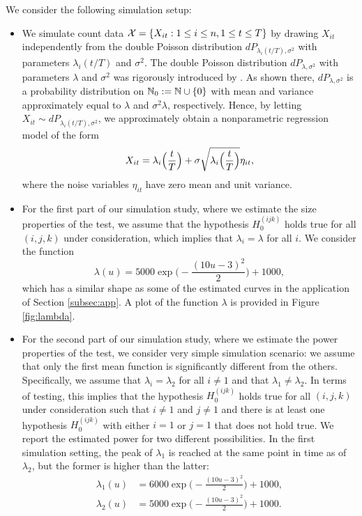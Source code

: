 \documentclass[a4paper,12pt]{article}
\numberwithin{equation}{section}
\begin{document}
We consider the following simulation setup: 
\begin{itemize}[leftmargin=0.45cm]

\item We simulate count data $\mathcal{X} = \{ X_{it}: 1 \le i \le n, 1 \le t \le T \}$ by drawing $X_{it}$ independently from the double Poisson distribution $dP_{\lambda_i(t/T),\sigma^2}$ with parameters $\lambda_i(t/T)$ and $\sigma^2$. The double Poisson distribution $dP_{\lambda,\sigma^2}$ with parameters $\lambda$ and $\sigma^2$ was rigorously introduced by \cite{Efron1986}. As shown there, $dP_{\lambda,\sigma^2}$ is a probability distribution on $\mathbb{N}_0 := \mathbb{N} \cup \{ 0 \}$ with mean and variance approximately equal to $\lambda$ and $\sigma^2 \lambda$, respectively. Hence, by letting $X_{it} \sim dP_{\lambda_i(t/T),\sigma^2}$, we approximately obtain a nonparametric regression model of the form 
\[ X_{it} = \lambda_i\Big(\frac{t}{T}\Big) + \sigma \sqrt{\lambda_i\Big(\frac{t}{T}\Big)} \eta_{it}, \]
where the noise variables $\eta_{it}$ have zero mean and unit variance.

\item For the first part of our simulation study, where we estimate the size properties of the test, we assume that the hypothesis $H_0^{(ijk)}$ holds true for all $(i,j,k)$ under consideration, which implies that $\lambda_i = \lambda$ for all $i$. We consider the function 
\[ \lambda(u) = 5000 \exp\Big(-\frac{(10 u-3)^2}{2}\Big) + 1000, \]
which has a similar shape as some of the estimated curves in the application of Section \ref{subsec:app}. A plot of the function $\lambda$ is provided in Figure \ref{fig:lambda}. 

\item For the second part of our simulation study, where we estimate the power properties of the test, we consider very simple simulation scenario: we assume that only the first mean function is significantly different from the others. Specifically, we assume that $\lambda_i = \lambda_2$ for all $i \neq 1$ and that $\lambda_1 \neq \lambda_2$. In terms of testing, this implies that the hypothesis $H_0^{(ijk)}$ holds true for all $(i, j, k)$ under consideration such that $i \neq 1$ and $j \neq 1$ and there is at least one hypothesis $H_0^{(ijk)}$ with either $i = 1$ or $j = 1$ that does not hold true. We report the estimated power for two different possibilities. In the first simulation setting, the peak of $\lambda_1$ is reached at the same point in time as of $\lambda_2$, but the former is higher than the latter:
\begin{align*}
\lambda_1(u) &= 6000 \exp\Big(-\frac{(10 u-3)^2}{2}\Big) + 1000,\\
\lambda_2(u) &= 5000 \exp\Big(-\frac{(10 u-3)^2}{2}\Big) + 1000.
\end{align*}


\end{itemize}
\end{document}

